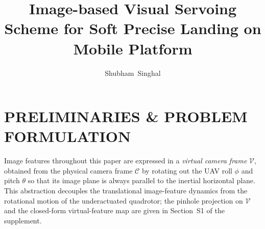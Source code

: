 
% 

\title{Image-based Visual Servoing Scheme for Soft Precise Landing on Mobile Platform}

\author{Shubham~Singhal}


\maketitle

\section{PRELIMINARIES \& PROBLEM FORMULATION} \label{background: section}
Image features throughout this paper are expressed in a \emph{virtual camera frame} $\mathcal{V}$, obtained from the physical camera frame $\mathcal{C}$ by rotating out the UAV roll $\phi$ and pitch $\theta$ so that its image plane is always parallel to the inertial horizontal plane. This abstraction \cite{fink2017, xie2016_2} decouples the translational image-feature dynamics from the rotational motion of the underactuated quadrotor; the pinhole projection on $\mathcal{V}$ and the closed-form virtual-feature map are given in Section~S1 of the supplement.

